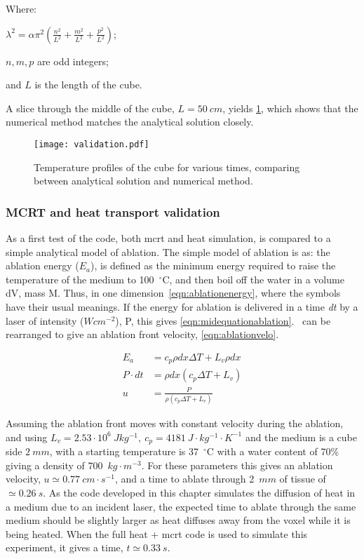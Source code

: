 \noindent Where:

	\indent $\lambda^2=\alpha\pi^2(\tfrac{n^2}{L^2}+\tfrac{m^2}{L^2}+\tfrac{p^2}{L^2})$;
	
	\indent $n,m,p$ are odd integers;
	
	\indent and $L$ is the length of the cube.
	
	\medskip
	
A slice through the middle of the cube, $L=50~cm$,  yields \cref{fig:validation-heat}, which shows that the numerical method matches the analytical solution closely.

\begin{figure}[!htbp]
	\centering
	\texttt{[image: validation.pdf]}
	\caption{Temperature profiles of the cube for various times, comparing between analytical solution and numerical method.}
	\label{fig:validation-heat}
\end{figure}	

\subsubsection*{MCRT and heat transport validation}


As a first test of the code, both \gls*{mcrt} and heat simulation, is compared to a simple analytical model of ablation. The simple model of ablation is as: the ablation energy ($E_a$), is defined as the minimum energy required to raise the temperature of the medium to 100~$^{\circ}$C, and then boil off the water in a volume dV, mass M. Thus, in one dimension~\cref{eqn:ablationenergy}, where the symbols have their usual meanings. If the energy for ablation is delivered in a time \textit{dt} by a laser of intensity ($Wcm^{-2}$), P, this gives \cref{eqn:midequationablation}.~ can be rearranged to give an ablation front velocity, \cref{eqn:ablationvelo}.


\begin{align}
E_a &= c_p \rho dx \Delta T + L_v \rho dx \label{eqn:ablationenergy}\\
P\cdot dt &= \rho dx (c_p \Delta T + L_v) \label{eqn:midequationablation} \\
u &= \frac{P}{\rho(c_p\Delta T+ L_v)} \label{eqn:ablationvelo}
\end{align}

Assuming the ablation front moves with constant velocity during the ablation, and using $L_v=2.53\cdot 10^6\ J kg^{-1},\ c_p=4181\ J\cdot kg^{-1}\cdot K^{-1}$ and the medium is a cube side $2\ mm$, with a starting temperature is 37~$^{\circ}$C with a water content of 70\% giving a density of 700~$kg\cdot m^{-3}$. For these parameters this gives an ablation velocity, $u\simeq 0.77\ cm\cdot s^{-1}$, and a time to ablate through 2~$mm$ of tissue of $\simeq 0.26~s$.
As the code developed in this chapter simulates the diffusion of heat in a medium due to an incident laser, the expected time to ablate through the same medium should be slightly larger as heat diffuses away from the voxel while it is being heated. When the full heat + \gls*{mcrt} code is used to simulate this experiment, it gives a time, $t \simeq 0.33~s$.	

